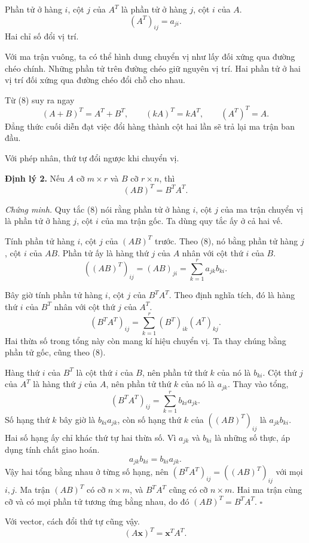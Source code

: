 \documentclass[12pt,a4paper]{article}
\begin{document}
Phần tử ở hàng \(i\), cột \(j\) của \(A^T\) là phần tử ở hàng \(j\), cột \(i\) của \(A\).
$$
(A^T)_{ij}=a_{ji}. \tag{8}
$$
Hai chỉ số đổi vị trí.

Với ma trận vuông, ta có thể hình dung chuyển vị như lấy đối xứng qua đường chéo chính. Những phần tử trên đường chéo giữ nguyên vị trí. Hai phần tử ở hai vị trí đối xứng qua đường chéo đổi chỗ cho nhau.

Từ (8) suy ra ngay
$$
(A+B)^T=A^T+B^T,\qquad (kA)^T=kA^T,\qquad (A^T)^T=A.
$$
Đẳng thức cuối diễn đạt việc đổi hàng thành cột hai lần sẽ trả lại ma trận ban đầu.

Với phép nhân, thứ tự đổi ngược khi chuyển vị.

\textbf{Định lý 2.} Nếu \(A\) cỡ \(m\times r\) và \(B\) cỡ \(r\times n\), thì
$$
(AB)^T=B^TA^T. \tag{9}
$$

\emph{Chứng minh.} Quy tắc (8) nói rằng phần tử ở hàng \(i\), cột \(j\) của ma trận chuyển vị là phần tử ở hàng \(j\), cột \(i\) của ma trận gốc. Ta dùng quy tắc ấy ở cả hai vế.

Tính phần tử hàng \(i\), cột \(j\) của \((AB)^T\) trước. Theo (8), nó bằng phần tử hàng \(j\), cột \(i\) của \(AB\). Phần tử ấy là hàng thứ \(j\) của \(A\) nhân với cột thứ \(i\) của \(B\).
$$
((AB)^T)_{ij}=(AB)_{ji}=\sum_{k=1}^{r}a_{jk}b_{ki}.
$$

Bây giờ tính phần tử hàng \(i\), cột \(j\) của \(B^TA^T\). Theo định nghĩa tích, đó là hàng thứ \(i\) của \(B^T\) nhân với cột thứ \(j\) của \(A^T\).
$$
(B^TA^T)_{ij}=\sum_{k=1}^{r}(B^T)_{ik}(A^T)_{kj}.
$$
Hai thừa số trong tổng này còn mang kí hiệu chuyển vị. Ta thay chúng bằng phần tử gốc, cũng theo (8).

Hàng thứ \(i\) của \(B^T\) là cột thứ \(i\) của \(B\), nên phần tử thứ \(k\) của nó là \(b_{ki}\). Cột thứ \(j\) của \(A^T\) là hàng thứ \(j\) của \(A\), nên phần tử thứ \(k\) của nó là \(a_{jk}\). Thay vào tổng,
$$
(B^TA^T)_{ij}=\sum_{k=1}^{r}b_{ki}a_{jk}.
$$
Số hạng thứ \(k\) bây giờ là \(b_{ki}a_{jk}\), còn số hạng thứ \(k\) của \(((AB)^T)_{ij}\) là \(a_{jk}b_{ki}\). Hai số hạng ấy chỉ khác thứ tự hai thừa số. Vì \(a_{jk}\) và \(b_{ki}\) là những số thực, áp dụng tính chất giao hoán.
$$
a_{jk}b_{ki}=b_{ki}a_{jk}.
$$
Vậy hai tổng bằng nhau ở từng số hạng, nên \((B^TA^T)_{ij}=((AB)^T)_{ij}\) với mọi \(i,j\). Ma trận \((AB)^T\) có cỡ \(n\times m\), và \(B^TA^T\) cũng có cỡ \(n\times m\). Hai ma trận cùng cỡ và có mọi phần tử tương ứng bằng nhau, do đó \((AB)^T=B^TA^T\). \(\square\)

Với vector, cách đổi thứ tự cũng vậy.
$$
(A\mathbf{x})^T=\mathbf{x}^TA^T.
$$
\end{document}
